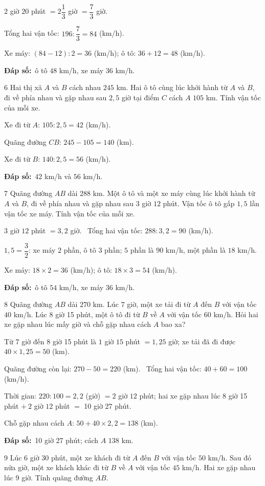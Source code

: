 \documentclass[11pt]{article}
\newif\ifsol \solfalse
\providecommand{\AnsWord}{Đáp số}
\newcommand{\dapso}[1]{\par\textbf{\AnsWord:}\ #1}
\newcommand{\probsol}[1]{%
  \begin{lrbox}{\solmeasure}\begin{minipage}{\dimexpr\linewidth-24pt\relax}#1\end{minipage}\end{lrbox}%
  \ifsol
    \begin{solbox}#1\end{solbox}%
  \else
    \setlength{\solht}{\dimexpr\ht\solmeasure+\dp\solmeasure+0.85cm\relax}%
    \ifdim\solht<1.35cm\setlength{\solht}{1.35cm}\fi
    \begin{tcolorbox}[colback=white,colframe=Line,boxrule=0.8pt,arc=5pt,
      left=8pt,right=8pt,top=4pt,bottom=4pt,height=\solht]{\footnotesize\color{Slate}\itshape\WorkWord}\end{tcolorbox}%
  \fi}
\newcommand{\gap}{\vspace{0.3cm}}
\def\WorkWord{Bài làm:}
\def\AnsWord{Đáp số}
\begin{document}
\probsol{
$2$ giờ $20$ phút $=2\dfrac13$ giờ $=\dfrac73$ giờ.\par Tổng hai vận tốc: $196:\dfrac73=84$ (km/h).\par
Xe máy: $(84-12):2=36$ (km/h); ô tô: $36+12=48$ (km/h).
\dapso{ô tô $48$ km/h, xe máy $36$ km/h.}}
\gap
\begin{probbox}{6}{\relax}
Hai thị xã $A$ và $B$ cách nhau $245$ km. Hai ô tô cùng lúc khởi hành từ $A$ và $B$, đi về phía nhau và gặp nhau sau $2{,}5$ giờ tại điểm $C$ cách $A$ $105$ km. Tính vận tốc của mỗi xe.
\end{probbox}
\probsol{
Xe đi từ $A$: $105:2{,}5=42$ (km/h).\par Quãng đường $CB$: $245-105=140$ (km).\par Xe đi từ $B$: $140:2{,}5=56$ (km/h).
\dapso{$42$ km/h và $56$ km/h.}}
\gap
\begin{probbox}{7}{\relax}
Quãng đường $AB$ dài $288$ km. Một ô tô và một xe máy cùng lúc khởi hành từ $A$ và $B$, đi về phía nhau và gặp nhau sau $3$ giờ $12$ phút. Vận tốc ô tô gấp $1{,}5$ lần vận tốc xe máy. Tính vận tốc của mỗi xe.
\end{probbox}
\probsol{
$3$ giờ $12$ phút $=3{,}2$ giờ. \ Tổng hai vận tốc: $288:3{,}2=90$ (km/h).\par
$1{,}5=\dfrac32$: xe máy $2$ phần, ô tô $3$ phần; $5$ phần là $90$ km/h, một phần là $18$ km/h.\par
Xe máy: $18\times2=36$ (km/h); ô tô: $18\times3=54$ (km/h).
\dapso{ô tô $54$ km/h, xe máy $36$ km/h.}}
\gap
\begin{probbox}{8}{\relax}
Quãng đường $AB$ dài $270$ km. Lúc 7 giờ, một xe tải đi từ $A$ đến $B$ với vận tốc $40$ km/h. Lúc 8 giờ 15 phút, một ô tô đi từ $B$ về $A$ với vận tốc $60$ km/h. Hỏi hai xe gặp nhau lúc mấy giờ và chỗ gặp nhau cách $A$ bao xa?
\end{probbox}
\probsol{
Từ 7 giờ đến 8 giờ 15 phút là $1$ giờ $15$ phút $=1{,}25$ giờ; xe tải đã đi được $40\times1{,}25=50$ (km).\par
Quãng đường còn lại: $270-50=220$ (km). \ Tổng hai vận tốc: $40+60=100$ (km/h).\par
Thời gian: $220:100=2{,}2$ (giờ) $=2$ giờ $12$ phút; hai xe gặp nhau lúc 8 giờ 15 phút $+\ 2$ giờ $12$ phút $=$ 10 giờ 27 phút.\par
Chỗ gặp nhau cách $A$: $50+40\times2{,}2=138$ (km).
\dapso{10 giờ 27 phút; cách $A$ $138$ km.}}
\gap
\begin{probbox}{9}{\relax}
Lúc 6 giờ 30 phút, một xe khách đi từ $A$ đến $B$ với vận tốc $50$ km/h. Sau đó nửa giờ, một xe khách khác đi từ $B$ về $A$ với vận tốc $45$ km/h. Hai xe gặp nhau lúc 9 giờ. Tính quãng đường $AB$.
\end{probbox}
\end{document}
